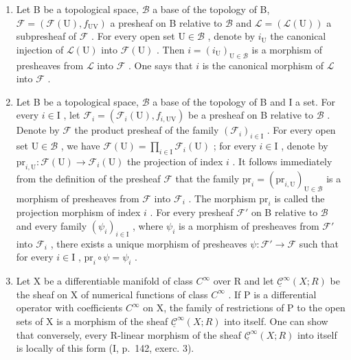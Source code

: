 \begin{enumerate}
\def\labelenumi{\arabic{enumi})}
\setcounter{enumi}{1}
\item
  Let B be a topological space, \(\mathcal{B}\) a base of the topology of B, \(\mathcal{F} = (\mathcal{F}(\mathrm{U}), f_{\mathrm{UV}})\) a presheaf on B relative to \(\mathcal{B}\) and \(\mathcal{L} = (\mathcal{L}(\mathrm{U}))\) a subpresheaf of \(\mathcal{F}\) . For every open set \(\mathrm{U} \in \mathcal{B}\) , denote by \(i_{\mathrm{U}}\) the canonical injection of \(\mathcal{L}(\mathrm{U})\) into \(\mathcal{F}(\mathrm{U})\) . Then \(i = (i_{\mathrm{U}})_{\mathrm{U} \in \mathcal{B}}\) is a morphism of presheaves from \(\mathcal{L}\) into \(\mathcal{F}\) . One says that \(i\) is the canonical morphism of \(\mathcal{L}\) into \(\mathcal{F}\) .
\item
  Let B be a topological space, \(\mathcal{B}\) a base of the topology of B and I a set. For every \(i\in\mathrm{I}\) , let \(\mathcal{F}_{i}=(\mathcal{F}_{i}(\mathrm{U}),f_{i,\mathrm{UV}})\) be a presheaf on B relative to \(\mathcal{B}\) . Denote by \(\mathcal{F}\) the product presheaf of the family \((\mathcal{F}_{i})_{i\in\mathrm{I}}\) . For every open set \(\mathrm{U}\in\mathcal{B}\) , we have \(\mathcal{F}(\mathrm{U})=\prod_{i\in\mathrm{I}}\mathcal{F}_{i}(\mathrm{U})\) ; for every \(i\in\mathrm{I}\) , denote by \(\mathrm{pr}_{i,\mathrm{U}}\colon\mathcal{F}(\mathrm{U})\to\mathcal{F}_{i}(\mathrm{U})\) the projection of index \(i\) . It follows immediately from the definition of the presheaf \(\mathcal{F}\) that the family \(\mathrm{pr}_{i}=(\mathrm{pr}_{i,\mathrm{U}})_{\mathrm{U}\in\mathcal{B}}\) is a morphism of presheaves from \(\mathcal{F}\) into \(\mathcal{F}_{i}\) . The morphism \(\mathrm{pr}_{i}\) is called the projection morphism of index \(i\) . For every presheaf \(\mathcal{F}'\) on B relative to \(\mathcal{B}\) and every family \((\psi_{i})_{i\in\mathrm{I}}\) , where \(\psi_{i}\) is a morphism of presheaves from \(\mathcal{F}'\) into \(\mathcal{F}_{i}\) , there exists a unique morphism of presheaves \(\psi\colon\mathcal{F}'\to\mathcal{F}\) such that for every \(i\in\mathrm{I}\) , \(\mathrm{pr}_{i}\circ\psi=\psi_{i}\) .
\item
  Let X be a differentiable manifold of class \(C^{\infty}\) over R and let \(\underline{\mathcal{C}}^{\infty}(X;R)\) be the sheaf on X of numerical functions of class \(C^{\infty}\) . If P is a differential operator with coefficients \(C^{\infty}\) on X, the family of restrictions of P to the open sets of X is a morphism of the sheaf \(\underline{\mathcal{C}}^{\infty}(X;R)\) into itself. One can show that conversely, every R-linear morphism of the sheaf \(\underline{\mathcal{C}}^{\infty}(X;R)\) into itself is locally of this form (I, p.~142, exerc. 3).
\end{enumerate}

